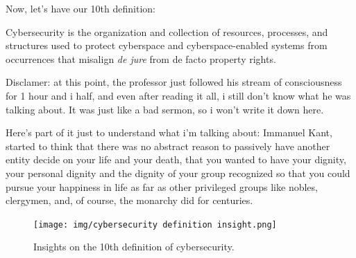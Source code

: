 Now, let's have our 10th definition:
\begin{boxH}
  Cybersecurity is the organization and collection of resources,
  processes, and structures used to protect cyberspace and
  cyberspace-enabled systems from occurrences that misalign \textit{de
  jure} from de facto property rights.
\end{boxH}

\begin{boxH}
  Disclamer: at this point, the professor just followed his stream of
  consciousness for 1 hour and i half, and even after reading it all,
  i still don't know what he was talking about. It was just like a bad
  sermon, so i won't write it down here.

  Here's part of it just to understand what i'm talking about: 
     Immanuel Kant, started to think that there was no abstract reason
     to passively have another entity decide on your life and your
     death, that you wanted to have your dignity, your personal
     dignity and the dignity of your group recognized so that you
     could pursue your happiness in life as far as other privileged
     groups like nobles, clergymen, and, of course, the monarchy did
     for centuries.

\end{boxH}
  

\begin{figure}[H]
  \centering
  \texttt{[image: img/cybersecurity definition
  insight.png]}
  \caption{Insights on the 10th definition of cybersecurity.}
\end{figure}
